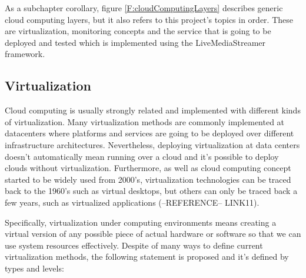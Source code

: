 As a subchapter corollary, figure \ref{F:cloudComputingLayers} describes generic cloud computing layers, but it also refers to this project's topics in order. These are virtualization, monitoring concepts and the service that is going to be deployed and tested which is implemented using the LiveMediaStreamer framework.

\subsection{Virtualization}\label{SOA:Virtualization}

Cloud computing is usually strongly related and implemented with different kinds of virtualization. Many virtualization methods are commonly implemented at datacenters where platforms and services are going to be deployed over different infrastructure architectures. Nevertheless, deploying virtualization at data centers doesn’t automatically mean running over a cloud and it’s possible to deploy clouds without virtualization. Furthermore, as well as cloud computing concept started to be widely used from 2000's, virtualization  technologies can be traced back to the 1960’s such as virtual desktops, but others can only be traced back a few years, such as virtualized applications (--REFERENCE-- LINK11).

Specifically, virtualization under computing environments means creating a virtual version of any possible piece of actual hardware or software so that we can use system resources effectively. Despite of many ways to define current virtualization methods, the following statement is proposed and it's defined by types and levels:

